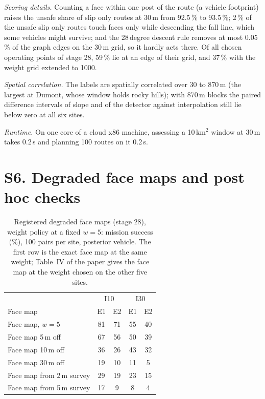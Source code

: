 \documentclass[10pt]{article}
\begin{document}
\textit{Scoring details.} Counting a face within one post of the route (a vehicle footprint) raises the unsafe share of slip only routes at 30\,m from 92.5\,\% to 93.5\,\%; 2\,\% of the unsafe slip only routes touch faces only while descending the fall line, which some vehicles might survive; and the 28\,degree descent rule removes at most 0.05\,\% of the graph edges on the 30\,m grid, so it hardly acts there. Of all chosen operating points of stage 28, 59\,\% lie at an edge of their grid, and 37\,\% with the weight grid extended to 1000.

\textit{Spatial correlation.} The labels are spatially correlated over 30 to 870\,m (the largest at Dumont, whose window holds rocky hills); with 870\,m blocks the paired difference intervals of slope and of the detector against interpolation still lie below zero at all six sites.

\textit{Runtime.} On one core of a cloud x86 machine, assessing a 10\,km$^2$ window at 30\,m takes 0.2\,s and planning 100 routes on it 0.2\,s.

\section*{S6. Degraded face maps and post hoc checks}
\begin{table}[H]
\caption{Registered degraded face maps (stage 28), weight policy at a fixed $w=5$: mission success (\%), 100 pairs per site, posterior vehicle. The first row is the exact face map at the same weight; Table~IV of the paper gives the face map at the weight chosen on the other five sites.}
\label{tab:planning_s}
\centering\small
\begin{tabular}{@{}lcccc@{}}
\toprule
 & \multicolumn{2}{c}{I10} & \multicolumn{2}{c}{I30} \\
Face map & E1 & E2 & E1 & E2 \\
\midrule
Face map, $w=5$ & 81 & 71 & 55 & 40 \\
Face map 5\,m off & 67 & 56 & 50 & 39 \\
Face map 10\,m off & 36 & 26 & 43 & 32 \\
Face map 30\,m off & 19 & 10 & 11 & 5 \\
Face map from 2\,m survey & 29 & 19 & 23 & 15 \\
Face map from 5\,m survey & 17 & 9 & 8 & 4 \\
\bottomrule
\end{tabular}
\end{table}
\end{document}
